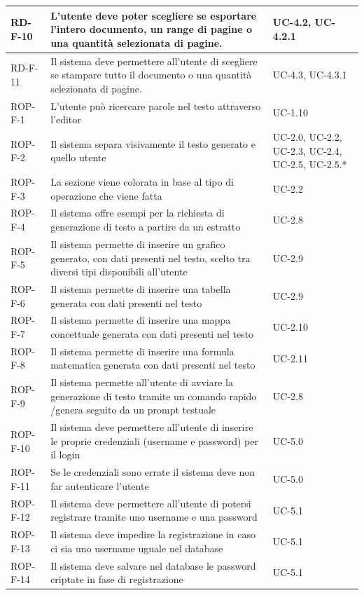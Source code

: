 \documentclass[11pt,a4paper]{article}
\begin{document}
\begin{longtable}{|p{}|>{\raggedright\arraybackslash}p{}|p{}|}
\hline
RD-F-10 & L'utente deve poter scegliere se esportare l'intero documento, un range di pagine o una quantità selezionata di pagine. & UC-4.2, UC-4.2.1\\
\hline
RD-F-11 & Il sistema deve permettere all’utente di scegliere se stampare tutto il documento o una quantità selezionata di pagine. & UC-4.3, UC-4.3.1\\
\hline
ROP-F-1 & L'utente può ricercare parole nel testo attraverso l'editor & UC-1.10 \\
\hline
ROP-F-2 & Il sistema separa visivamente il testo generato e quello utente & UC-2.0, UC-2.2, UC-2.3, UC-2.4, UC-2.5, UC-2.5.* \\
\hline
ROP-F-3 & La sezione viene colorata in base al tipo di operazione che viene fatta & UC-2.2 \\
\hline
ROP-F-4 & Il sistema offre esempi per la richiesta di generazione di testo a partire da un estratto & UC-2.8 \\
\hline
ROP-F-5 & Il sistema permette di inserire un grafico generato, con dati presenti nel testo, scelto tra diversi tipi disponibili all'utente & UC-2.9 \\
\hline
ROP-F-6 & Il sistema permette di inserire una tabella generata con dati presenti nel testo & UC-2.9 \\
\hline
ROP-F-7 & Il sistema permette di inserire una mappa concettuale generata con dati presenti nel testo & UC-2.10 \\
\hline
ROP-F-8 & Il sistema permette di inserire una formula matematica generata con dati presenti nel testo & UC-2.11 \\
\hline
ROP-F-9 & Il sistema permette all'utente di avviare la generazione di testo tramite un comando rapido /genera seguito da un prompt testuale & UC-2.8 \\
\hline
ROP-F-10 & Il sistema deve permettere all'utente di inserire le proprie credenziali (username e password) per il login & UC-5.0 \\
\hline
ROP-F-11 & Se le credenziali sono errate il sistema deve non far autenticare l'utente & UC-5.0 \\
\hline
ROP-F-12 & Il sistema deve permettere all'utente di potersi registrare tramite uno username e una password & UC-5.1 \\
\hline
ROP-F-13 & Il sistema deve impedire la registrazione in caso ci sia uno username uguale nel database & UC-5.1 \\
\hline
ROP-F-14 & Il sistema deve salvare nel database le password criptate in fase di registrazione & UC-5.1 \\

\end{longtable}
\end{document}
